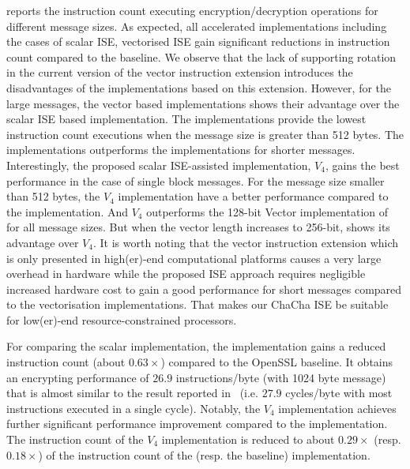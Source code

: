  reports the instruction count executing encryption/decryption operations for different message sizes. 
As expected, all accelerated implementations including the cases of scalar ISE, vectorised ISE gain significant reductions in instruction count compared to the baseline. 
We observe that the lack of supporting rotation in the current version of the vector instruction extension introduces the disadvantages of the implementations based on this extension. 
However, for the large messages, the vector based implementations shows their advantage over the scalar ISE based implementation. 
The  implementations provide the lowest instruction count executions when the message size is greater than 512 bytes. 
The  implementations outperforms the  implementations for shorter messages.
Interestingly, the proposed scalar ISE-assisted implementation, $V_4$, gains the best performance in the case of single block messages.
For the message size smaller than 512 bytes, the $V_4$ implementation have a better performance compared to the  implementation. 
And $V_4$ outperforms the 128-bit Vector implementation of  for all message sizes. But when the vector length increases to 256-bit,  shows its advantage over $V_4$. It is worth noting that the vector instruction extension which is only presented in high(er)-end computational platforms causes a very large overhead in hardware while the proposed ISE approach requires negligible increased hardware cost to gain a good performance for short messages compared to the vectorisation implementations. That makes our ChaCha ISE be suitable for low(er)-end resource-constrained processors.

For comparing the scalar implementation, the  implementation gains a reduced instruction count (about $0.63\times$) compared to the OpenSSL baseline.
It obtains an encrypting performance of $26.9$ instructions/byte (with 1024 byte message) that is almost similar to the result reported in~\cite{Sto:19} (i.e. $27.9$ cycles/byte with most instructions executed in a single cycle). 
Notably, the $V_4$ implementation achieves further significant performance improvement compared to the  implementation. 
The instruction count of the $V_4$ implementation is reduced to about $0.29\times$ (resp. $0.18\times$) of the instruction count of the  (resp. the baseline) implementation.


